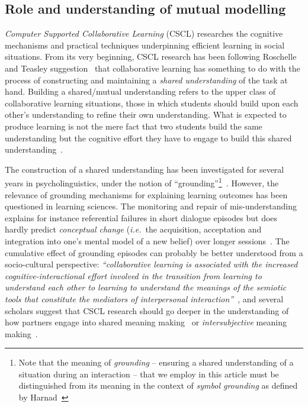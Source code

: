 \documentclass{sig-alternate}
\newcommand{\ie}{{\textit{i.e.~}}}
\begin{document}
\subsection{Role and understanding of mutual modelling}

\emph{Computer Supported Collaborative Learning} (CSCL) researches the cognitive
mechanisms and practical techniques underpinning efficient learning in social
situations. From its very beginning, CSCL research has been following
Roschelle and Teasley suggestion~\cite{roschelle1995construction} that
collaborative learning has something to do with the process of constructing and
maintaining a \emph{shared understanding} of the task at hand. Building a shared/mutual
understanding refers to the upper class of collaborative learning situations,
those in which students should build upon each other's understanding to refine
their own understanding.  What is expected to produce learning is not the mere
fact that two students build the same understanding but the cognitive effort
they have to engage to build this shared
understanding~\cite{schwartz1995emergence}.

The construction of a shared understanding has been investigated for several
years in psycholinguistics, under the  notion of ``grounding''\footnote{Note
that the meaning of \emph{grounding} -- ensuring a shared understanding of a
situation during an interaction -- that we employ in this article must be
distinguished from its meaning in the context of \emph{symbol grounding} as
defined by Harnad~\cite{harnad1990symbol}}~\cite{clark1986referring}.  However, the
relevance of grounding mechanisms for explaining learning outcomes has been
questioned in learning sciences. The monitoring and repair of mis-understanding
explains for instance referential failures in short dialogue episodes but does
hardly predict \emph{conceptual change} (\ie the acquisition, acceptation and
integration into one's mental model of a new belief)
over longer sessions~\cite{dillenbourg2006sharing}. The cumulative effect of
grounding episodes can probably be better understood from a socio-cultural
perspective: \emph{``collaborative learning is associated with the increased
cognitive-interactional effort involved in the transition from learning to
understand each other to learning to understand the meanings of the semiotic
tools that constitute the mediators of interpersonal
interaction''}~\cite{baker1999role}, and
several scholars suggest that CSCL research should go deeper in the
understanding of how partners engage into shared meaning
making~\cite{stahl2007meaning} or \emph{intersubjective} meaning
making~\cite{suthers2006technology}.
\end{document}

